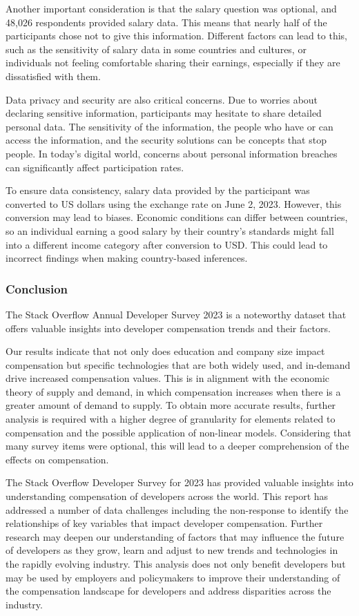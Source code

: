 \documentclass[
  12pt,
]{article}
\begin{document}
Another important consideration is that the salary question was
optional, and 48,026 respondents provided salary data. This means that
nearly half of the participants chose not to give this information.
Different factors can lead to this, such as the sensitivity of salary
data in some countries and cultures, or individuals not feeling
comfortable sharing their earnings, especially if they are dissatisfied
with them.

Data privacy and security are also critical concerns. Due to worries
about declaring sensitive information, participants may hesitate to
share detailed personal data. The sensitivity of the information, the
people who have or can access the information, and the security
solutions can be concepts that stop people. In today's digital world,
concerns about personal information breaches can significantly affect
participation rates.

To ensure data consistency, salary data provided by the participant was
converted to US dollars using the exchange rate on June 2, 2023.
However, this conversion may lead to biases. Economic conditions can
differ between countries, so an individual earning a good salary by
their country's standards might fall into a different income category
after conversion to USD. This could lead to incorrect findings when
making country-based inferences.

\hypertarget{conclusion}{%
\subsubsection{Conclusion}\label{conclusion}}

The Stack Overflow Annual Developer Survey 2023 is a noteworthy dataset
that offers valuable insights into developer compensation trends and
their factors.

Our results indicate that not only does education and company size
impact compensation but specific technologies that are both widely used,
and in-demand drive increased compensation values. This is in alignment
with the economic theory of supply and demand, in which compensation
increases when there is a greater amount of demand to supply. To obtain
more accurate results, further analysis is required with a higher degree
of granularity for elements related to compensation and the possible
application of non-linear models. Considering that many survey items
were optional, this will lead to a deeper comprehension of the effects
on compensation.

The Stack Overflow Developer Survey for 2023 has provided valuable
insights into understanding compensation of developers across the world.
This report has addressed a number of data challenges including the
non-response to identify the relationships of key variables that impact
developer compensation. Further research may deepen our understanding of
factors that may influence the future of developers as they grow, learn
and adjust to new trends and technologies in the rapidly evolving
industry. This analysis does not only benefit developers but may be used
by employers and policymakers to improve their understanding of the
compensation landscape for developers and address disparities across the
industry.
\end{document}
